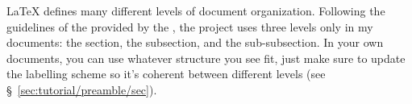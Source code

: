 \LaTeX{} defines many different levels of document organization. Following the guidelines of the  provided by the  \parencite{report:udes-writing-guide}, the project uses three levels only in my documents: the section, the subsection, and the sub-subsection. In your own documents, you can use whatever structure you see fit, just make sure to update the labelling scheme so it's coherent between different levels (see \S~\ref{sec:tutorial/preamble/sec}).

\begingroup
    \setlength{\columnA}{0.13\linewidth}
    \setlength{\columnB}{0.27\linewidth}
    \setlength{\columnC}{\linewidth-\columnA-\columnB}
    
    \setlength{\columnA}{\columnA-2\tabcolsep-4\vbar/3}
    \setlength{\columnB}{\columnB-2\tabcolsep-4\vbar/3}
    \setlength{\columnC}{\columnC-2\tabcolsep-4\vbar/3}
    
